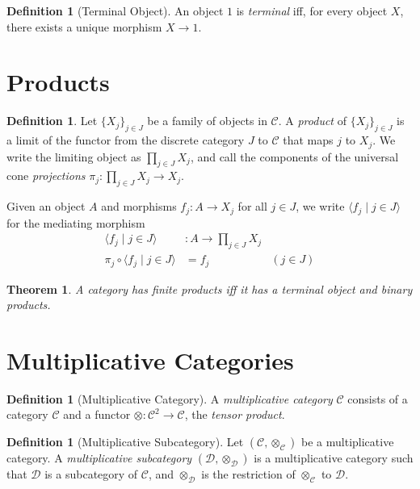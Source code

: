 \documentclass{book}
\newtheorem{thm}[lm]{Theorem}
\theoremstyle{definition}
\newtheorem{df}[lm]{Definition}
\begin{document}
  \begin{df}[Terminal Object]
    An object $1$ is \emph{terminal} iff, for every object $X$, there exists a 
    unique morphism $X \rightarrow 1$.
  \end{df}
  
  \section{Products}
  
  \begin{df}
    Let $\{X_j\}_{j \in J}$ be a family of objects in $\mathcal{C}$. A 
    \emph{product} of $\{X_j\}_{j \in J}$ is a limit of the functor from the 
    discrete category $J$ to $\mathcal{C}$ that maps $j$ to $X_j$. We write the 
    limiting object as $\prod_{j \in J} X_j$, and call the components of the 
    universal cone \emph{projections} $\pi_j : \prod_{j \in J} X_j \rightarrow 
    X_j$.
    
    Given an object $A$ and morphisms $f_j : A \rightarrow X_j$ for all $j \in 
    J$, 
    we write $\langle f_j \mid j \in J \rangle$ for the mediating morphism
    \begin{align*}
      \langle f_j \mid j \in J \rangle & : A \rightarrow \prod_{j \in J} X_j \\
      \pi_j \circ \langle f_j \mid j \in J \rangle & = f_j & (j \in J)
    \end{align*}
  \end{df}
  
  \begin{thm}
    A category has finite products iff it has a terminal object and binary 
    products.
  \end{thm}
  
  \section{Multiplicative Categories}
  
  \begin{df}[Multiplicative Category]
    A \emph{multiplicative category} $\mathcal{C}$ consists of a category 
    $\mathcal{C}$ and a functor $\otimes : \mathcal{C}^2 \rightarrow 
    \mathcal{C}$, 
    the \emph{tensor product}.
  \end{df}
  
  \begin{df}[Multiplicative Subcategory]
    Let $(\mathcal{C}, \otimes_{\mathcal{C}})$ be a multiplicative category. A 
    \emph{multiplicative subcategory} $(\mathcal{D}, \otimes_{\mathcal{D}})$ is 
    a 
    multiplicative category such that $\mathcal{D}$ is a subcategory of 
    $\mathcal{C}$, and $\otimes_{\mathcal{D}}$ is the restriction of 
    $\otimes_{\mathcal{C}}$ to $\mathcal{D}$. 
  \end{df}
  
\end{document}

